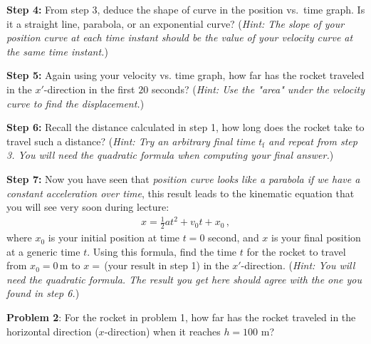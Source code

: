\documentclass[11pt]{article}
\begin{document}
\textbf{Step 4:} From step 3, deduce the shape of curve in the position vs.\ time graph. Is it a straight line, parabola, or an exponential curve? (\textit{Hint: The slope of your position curve at each time instant should be the value of your velocity curve at the same time instant.})


\textbf{Step 5:} Again using your velocity vs. time graph, how far has the rocket traveled in the $x'$-direction in the first $20$ seconds? (\textit{Hint: Use the "area" under the velocity curve to find the displacement.})
\newline\newline\newline
\newline\newline\newline

\textbf{Step 6:} Recall the distance calculated in step 1, how long does the rocket take to travel such a distance? (\textit{Hint: Try an arbitrary final time $t_{\text{f}}$ and repeat from step 3. You will need the quadratic formula when computing your final answer.})
\newline\newline\newline
\newline\newline\newline

\textbf{Step 7:} Now you have seen that \textit{position curve looks like a parabola if we have a constant acceleration over time}, this result leads to the kinematic equation that you will see very soon during lecture:
\begin{align*}
x = \frac{1}{2}at^2 + v_0 t + x_0\,,
\end{align*}
where $x_0$ is your initial position at time $t = 0$ second, and $x$ is your final position at a generic time $t$. Using this formula, find the time $t$ for the rocket to travel from $x_0 = 0$\,m  to $x = \,$(your result in step 1) in the $x'$-direction. (\textit{Hint: You will need the quadratic formula. The result you get here should agree with the one you found in step 6.})
\newline\newline\newline
\newline\newline\newline
\newline\newline\newline


\noindent \textbf{Problem 2}: For the rocket in problem 1, how far has the rocket traveled in the horizontal direction ($x$-direction) when it reaches $h = 100$ m?

%
\end{document}
